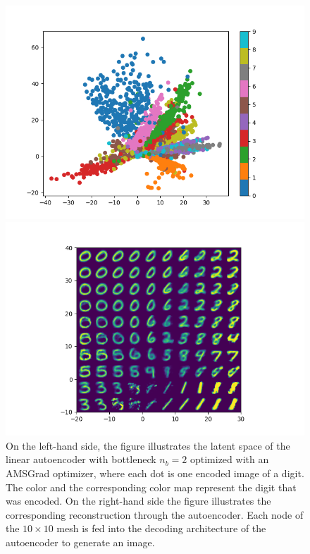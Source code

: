 \begin{figure}
\begin{center}
   \begin{minipage}[b]{0.49\linewidth}
      \includegraphics[trim = 15mm 5mm 15mm 10mm, clip, width=\linewidth]{linear_AE_2d_amsgrad_latent}
	\end{minipage}
	\begin{minipage}[b]{0.49\linewidth}
      \includegraphics[trim = 15mm 5mm 15mm 10mm, clip, width=\linewidth]{linear_AE_2d_amsgrad_reconstruction}
	\end{minipage}
\end{center}
\caption{On the left-hand side, the figure illustrates the latent space of the linear autoencoder with bottleneck $n_b=2$ optimized with an AMSGrad optimizer, where each dot is one encoded image of a digit. The color and the corresponding color map represent the digit that was encoded. On the right-hand side the figure illustrates the corresponding reconstruction through the autoencoder. Each node of the $10\times 10$ mesh is fed into the decoding architecture of the autoencoder to generate an image.}\label{fig:linear_AE_2d_amsgrad_latent}
\end{figure}


